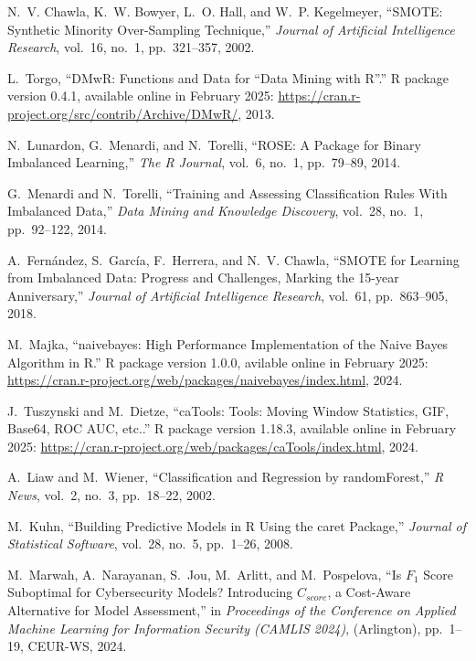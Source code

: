 \documentclass[5p, twocolumn, numbers, sort]{elsarticle}
\begin{document}
\begin{thebibliography}{10}
N.~V. Chawla, K.~W. Bowyer, L.~O. Hall, and W.~P. Kegelmeyer, ``{SMOTE}:
  {S}ynthetic {M}inority {O}ver-{S}ampling {T}echnique,'' {\em Journal of
  Artificial Intelligence Research}, vol.~16, no.~1, pp.~321--357, 2002.

L.~Torgo, ``{DMwR}: {F}unctions and {D}ata for ``{D}ata {M}ining with {R}''.''
  {R} package version 0.4.1, available online in February 2025:
  \url{https://cran.r-project.org/src/contrib/Archive/DMwR/}, 2013.

N.~Lunardon, G.~Menardi, and N.~Torelli, ``{ROSE}: {A} {P}ackage for {B}inary
  {I}mbalanced {L}earning,'' {\em The R Journal}, vol.~6, no.~1, pp.~79--89,
  2014.

G.~Menardi and N.~Torelli, ``{T}raining and {A}ssessing {C}lassification
  {R}ules {W}ith {I}mbalanced {D}ata,'' {\em Data Mining and Knowledge
  Discovery}, vol.~28, no.~1, pp.~92--122, 2014.

A.~Fern\'andez, S.~Garc\'ia, F.~Herrera, and N.~V. Chawla, ``{SMOTE} for
  {L}earning from {I}mbalanced {D}ata: {P}rogress and {C}hallenges, {M}arking
  the 15-year {A}nniversary,'' {\em Journal of Artificial Intelligence
  Research}, vol.~61, pp.~863--905, 2018.

M.~Majka, ``naivebayes: {H}igh {P}erformance {I}mplementation of the {N}aive
  {B}ayes {A}lgorithm in {R}.'' R package version 1.0.0, avilable online in
  February 2025:
  \url{https://cran.r-project.org/web/packages/naivebayes/index.html}, 2024.

J.~Tuszynski and M.~Dietze, ``ca{T}ools: {T}ools: {M}oving {W}indow
  {S}tatistics, {GIF}, {B}ase64, {ROC} {AUC}, etc..'' {R} package version
  1.18.3, available online in February 2025:
  \url{https://cran.r-project.org/web/packages/caTools/index.html}, 2024.

A.~Liaw and M.~Wiener, ``{C}lassification and {R}egression by random{F}orest,''
  {\em R News}, vol.~2, no.~3, pp.~18--22, 2002.

M.~Kuhn, ``{B}uilding {P}redictive {M}odels in {R} {U}sing the caret
  {P}ackage,'' {\em Journal of Statistical Software}, vol.~28, no.~5,
  pp.~1--26, 2008.

M.~Marwah, A.~Narayanan, S.~Jou, M.~Arlitt, and M.~Pospelova, ``{I}s ${F}_1$
  {S}core {S}uboptimal for {C}ybersecurity {M}odels? {I}ntroducing
  ${C}_{score}$, a {C}ost-{A}ware {A}lternative for {M}odel {A}ssessment,'' in
  {\em Proceedings of the Conference on Applied Machine Learning for
  Information Security (CAMLIS 2024)}, (Arlington), pp.~1--19, CEUR-WS, 2024.


\end{thebibliography}
\end{document}

